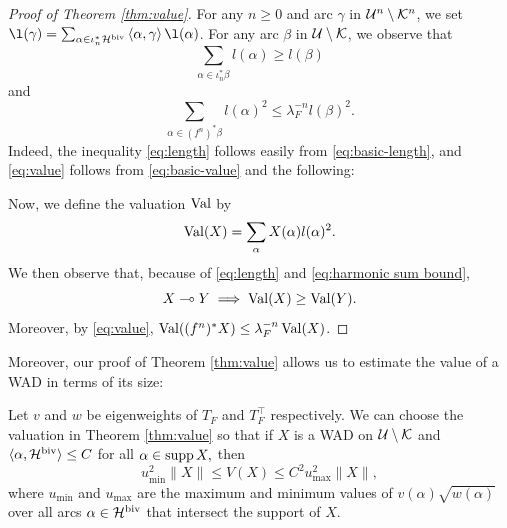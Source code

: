 \begin{proof}[Proof of Theorem \ref{thm:value}]
For any $n\geq 0$ and arc $\gamma$ in $\mathcal U^n\setminus \mathcal K^n$, we set $\l(\gamma) = \sum_{\alpha\in \iota_n^*\HH^\biv} \pair{\alpha}{\gamma}\l(\alpha)$.
For any arc $\beta$ in $\mathcal U\setminus \mathcal K$, we observe that
\begin{equation} \label{eq:length}
	 \sum_{\alpha\in \iota_n^*\beta} l(\alpha) \ge l(\beta)
\end{equation}
and
\begin{equation} \label{eq:value}
	\sum_{\alpha\in (f^n)^*\beta} l(\alpha)^2 \le \lambda_F^{-n} l(\beta)^2. 
\end{equation}
Indeed, the inequality \eqref{eq:length} follows easily from \eqref{eq:basic-length},
and \eqref{eq:value} follows from \eqref{eq:basic-value} and the following:


Now, we define the {valuation} $\operatorname{Val}$ by $$\operatorname{Val}(X) = \sum_\alpha X(\alpha) l(\alpha)^2.$$
We then observe that,
because of \eqref{eq:length} and \eqref{eq:harmonic sum bound}, 
\begin{equation}
	X \multimap Y \implies \operatorname{Val}(X) \ge \operatorname{Val}(Y).
\end{equation}
Moreover, 
by \eqref{eq:value},
$\operatorname{Val}((f^n)^*X) \le \lambda_F^{-n} \operatorname{Val}(X)$.
\end{proof}

Moreover, our proof of Theorem \ref{thm:value} allows us to estimate the value of a WAD in terms of its size:
\begin{prop}\label{prop:value estimate}
    Let $v$ and $w$ be eigenweights of $T_F$ and $T_F^\top$ respectively.
    We can choose the valuation in Theorem \ref{thm:value} so that if $X$ is a WAD on $\mathcal U\setminus \mathcal K$ and $\langle \alpha, \mathcal H^{\mathrm{biv}}\rangle\leq C$ for all $\alpha\in \operatorname{supp} X,$
    then
    $$u_{\min}^2\|X\|\leq V(X)\leq C^2u_{\max}^2\|X\|,$$
    where $u_{\min}$ and $u_{\max}$ are the maximum and minimum values of $v(\alpha)\sqrt{w(\alpha)}$ over all arcs $\alpha\in \mathcal H^{\mathrm{biv}}$ that intersect the support of $X$.
\end{prop}
    




